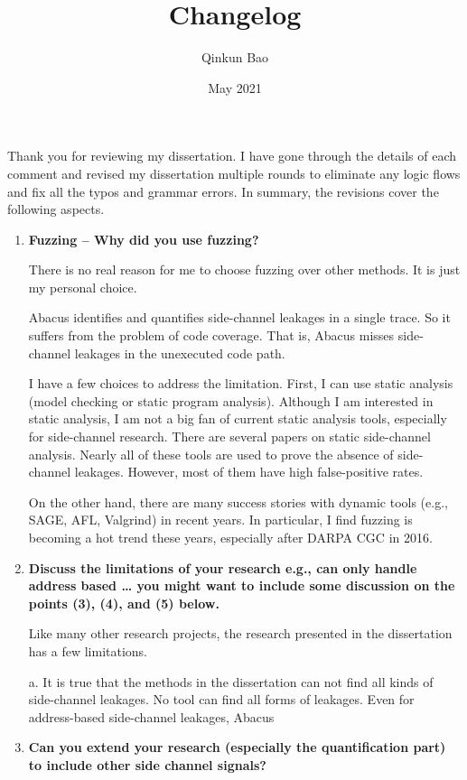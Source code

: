 \documentclass{article}
\title{Changelog}
\author{Qinkun Bao}
\date{May 2021}
\begin{document}
\maketitle
Thank you for reviewing my dissertation. I have gone through the details of each comment and revised my dissertation multiple rounds to eliminate any logic flows and fix all the typos and grammar errors. In summary, the revisions cover the following aspects.


\begin{enumerate}
\item \textbf{Fuzzing – Why did you use fuzzing?}

There is no real reason for me to choose fuzzing over other methods. It is just my personal choice.

Abacus identifies and quantifies side-channel leakages in a single trace. So it suffers from the problem of code coverage.  That is, Abacus misses side-channel leakages in the unexecuted code path. 

I have a few choices to address the limitation. First, I can use static analysis (model checking or static program analysis). Although I am interested in static analysis, I am not a big fan of current static analysis tools, especially for side-channel research. There are several papers on static side-channel analysis. Nearly all of these tools are used to prove the absence of side-channel leakages. However, most of them have high false-positive rates. 

On the other hand, there are many success stories with dynamic tools (e.g., SAGE, AFL, Valgrind) in recent years. In particular, I find fuzzing is becoming a hot trend these years, especially after DARPA CGC in 2016.

\item \textbf{Discuss the limitations of your research
e.g., can only handle address based …
you might want to include some discussion on the points (3), (4), and (5) below.}

Like many other research projects, the research presented in the dissertation has a few limitations.

a. It is true that the methods in the dissertation can not find all kinds of side-channel leakages. No tool can find all forms of leakages. Even for address-based side-channel leakages, Abacus 

\item \textbf{Can you extend your research (especially the quantification part) to include other side channel signals?}


\end{enumerate}
\end{document}
